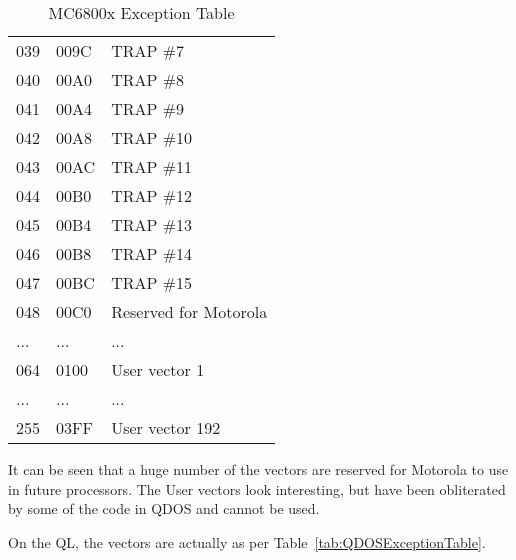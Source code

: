\begin{table}[htbp]
\begin{tabular}{l l l}
039 & 009C & TRAP \#7 \\
040 & 00A0 & TRAP \#8 \\
041 & 00A4 & TRAP \#9 \\
042 & 00A8 & TRAP \#10 \\
043 & 00AC & TRAP \#11 \\
044 & 00B0 & TRAP \#12 \\
045 & 00B4 & TRAP \#13 \\
046 & 00B8 & TRAP \#14 \\
047 & 00BC & TRAP \#15 \\
048 & 00C0 & Reserved for Motorola \\
... & ... & ... \\
064 & 0100 & User vector 1 \\
... & ... & ... \\
255 & 03FF & User vector 192 \\
%
\bottomrule
\end{tabular}
\caption{MC6800x Exception Table}
\label{tab:MC6800xExceptionTable}
\end{table}

It can be seen that a huge number of the vectors are reserved for
    Motorola to use in future processors. The User vectors look interesting,
    but have been obliterated by some of the code in QDOS and cannot be
    used.

On the QL, the vectors are actually as per Table~\ref{tab:QDOSExceptionTable}.

